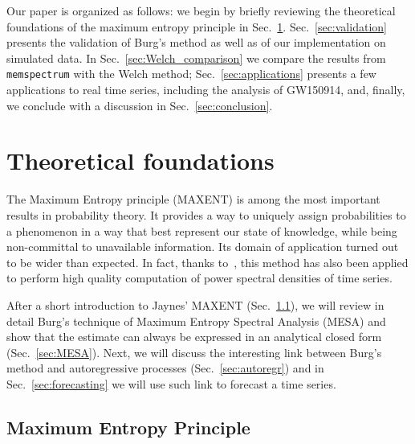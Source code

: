\documentclass{aa}
\begin{document}
Our paper is organized as follows: we begin by briefly reviewing the theoretical foundations of the maximum entropy principle in Sec.~\ref{sec:foundations}. Sec.~\ref{sec:validation} presents the validation of Burg's method as well as of our implementation on simulated data. In Sec.~\ref{sec:Welch_comparison} we compare the results from \texttt{memspectrum} with the Welch method; Sec.~\ref{sec:applications} presents a few applications to real time series, including the analysis of GW150914, and, finally, we conclude with a discussion in Sec.~\ref{sec:conclusion}.


\section{Theoretical foundations}\label{sec:foundations}
The Maximum Entropy principle (MAXENT) is among the most important results in probability theory. It provides a way to uniquely assign probabilities to a phenomenon in a way that best represent our state of knowledge, while being non-committal to unavailable information. Its domain of application turned out to be wider than expected. In fact, thanks to~\citet{burg1975maximum}, this method has also been applied to perform high quality computation of power spectral densities of time series.

After a short introduction to Jaynes' MAXENT (Sec.~\ref{sec:MAXENT}), we will review in detail Burg's technique of Maximum Entropy Spectral Analysis (MESA) and show that the estimate can always be expressed in an analytical closed form (Sec.~\ref{sec:MESA}).
Next, we will discuss the interesting link between Burg's method and autoregressive processes (Sec.~\ref{sec:autoregr}) and in Sec.~\ref{sec:forecasting} we will use such link to forecast a time series.

\subsection{Maximum Entropy Principle} \label{sec:MAXENT}
\end{document}
